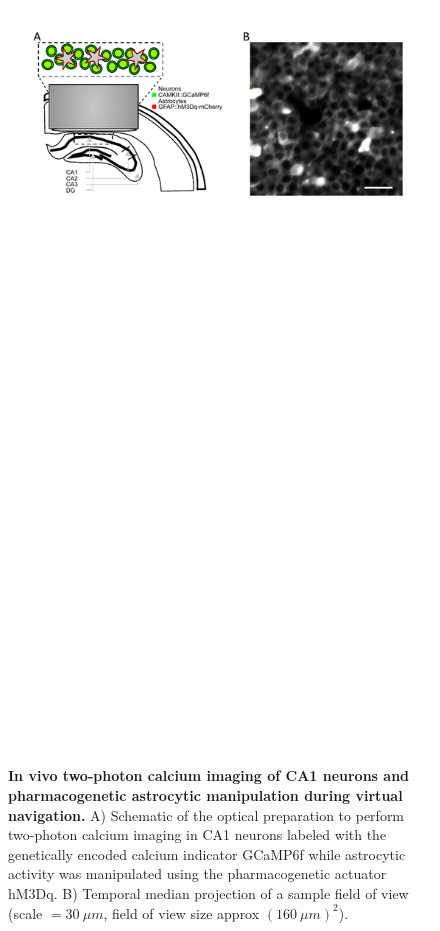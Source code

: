 \begin{figure}[h!]
    \centering
    \includegraphics[trim={0 530 0 0},clip,width=\textwidth]{Figures/Chapter4/FOV_example_setup.pdf}
    \caption[In vivo two-photon calcium imaging of CA1 neurons and pharmacogenetic astrocytic manipulation during virtual navigation.]{\textbf{In vivo two-photon calcium imaging of CA1 neurons and pharmacogenetic astrocytic manipulation during virtual navigation.} 
    A) Schematic of the optical preparation to perform two-photon calcium imaging in CA1 neurons labeled with the genetically encoded calcium indicator GCaMP6f while astrocytic activity was manipulated using the pharmacogenetic actuator hM3Dq. 
    B) Temporal median projection of a sample field of view (scale $= 30\ \mu m$, field of view size approx $(160\ \mu m)^2$).}
    \label{fig:chap4:FOV_example_setup}
\end{figure}
